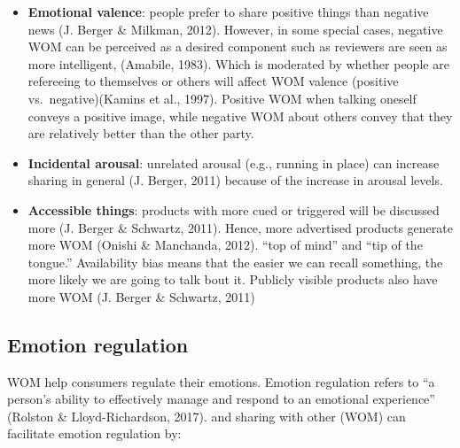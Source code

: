 \documentclass[
]{book}
\begin{document}
\begin{itemize}
\item
  \textbf{Emotional valence}: people prefer to share positive things than negative news (J. Berger \& Milkman, 2012). However, in some special cases, negative WOM can be perceived as a desired component such as reviewers are seen as more intelligent, (Amabile, 1983). Which is moderated by whether people are refereeing to themselves or others will affect WOM valence (positive vs.~negative)(Kamins et al., 1997). Positive WOM when talking oneself conveys a positive image, while negative WOM about others convey that they are relatively better than the other party.
\item
  \textbf{Incidental arousal}: unrelated arousal (e.g., running in place) can increase sharing in general (J. Berger, 2011) because of the increase in arousal levels.
\item
  \textbf{Accessible things}: products with more cued or triggered will be discussed more (J. Berger \& Schwartz, 2011). Hence, more advertised products generate more WOM (Onishi \& Manchanda, 2012). ``top of mind'' and ``tip of the tongue.'' Availability bias means that the easier we can recall something, the more likely we are going to talk bout it. Publicly visible products also have more WOM (J. Berger \& Schwartz, 2011)
\end{itemize}

\hypertarget{emotion-regulation}{%
\subsection{Emotion regulation}\label{emotion-regulation}}

WOM help consumers regulate their emotions. Emotion regulation refers to ``a person's ability to effectively manage and respond to an emotional experience'' (Rolston \& Lloyd-Richardson, 2017). and sharing with other (WOM) can facilitate emotion regulation by:
\end{document}
